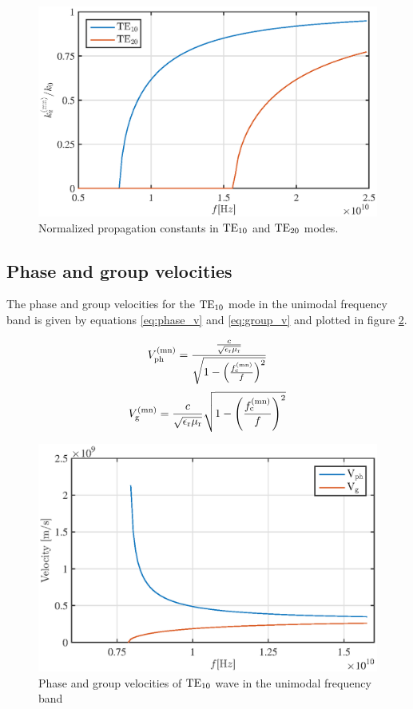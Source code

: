 \documentclass[12pt,a4paper, english, titlepage]{article}
\begin{document}
\begin{figure}[h t b p]
\centering
\includegraphics[width=\textwidth,keepaspectratio]{figures/prop_const.eps}
\caption{Normalized propagation constants in $\rm TE_{10}$ and $\rm TE_{20}$ modes.}
\label{fig:prop_const}
\end{figure}

\subsection{Phase and group velocities}
The phase and group velocities for the $\rm TE_{10}$ mode in the unimodal frequency band is given by equations \ref{eq:phase_v} and \ref{eq:group_v} and plotted in figure \ref{fig:velocity}.

\begin{equation}
V_{\rm ph}^{\rm (mn)} = \frac{\frac{c}{\sqrt{\epsilon_{\rm r} \mu_{\rm r}}}}{\sqrt{1-\left(\frac{f_{\rm c}^{\rm (mn)}}{f}\right)^2}}
\label{eq:phase_v}
\end{equation}
\begin{equation}
V_{\rm g}^{\rm (mn)} = \frac{c}{\sqrt{\epsilon_{\rm r} \mu_{\rm r}}}{\sqrt{1-\left(\frac{f_{\rm c}^{\rm (mn)}}{f}\right)^2}}
\label{eq:group_v}
\end{equation}
\begin{figure}[h t b p]
\centering
\includegraphics[width=\textwidth,keepaspectratio]{figures/velocity.eps}
\caption{Phase and group velocities of ${\rm TE}_{\rm 10}$ wave in the unimodal frequency band}
\label{fig:velocity}
\end{figure}
\end{document}
